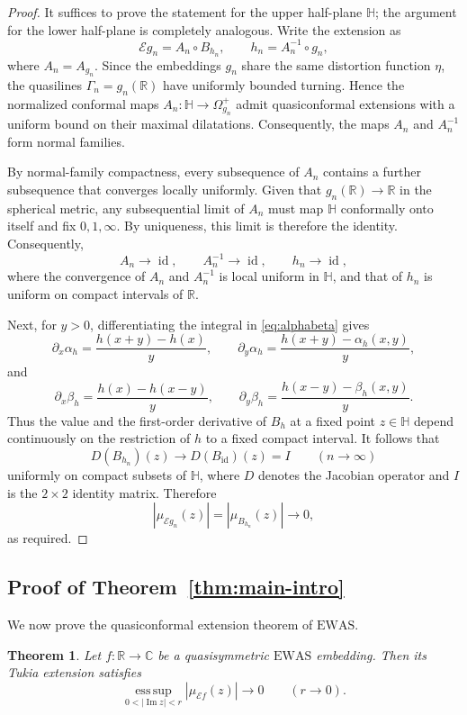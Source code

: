 \documentclass[10pt,a4paper]{amsart}
\numberwithin{equation}{section}
\newtheorem{theorem}{Theorem}[section]
\newcommand{\R}{\mathbb{R}}
\newcommand{\C}{\mathbb{C}}
\newcommand{\Hh}{\mathbb{H}}
\newcommand{\id}{\operatorname{id}}
\newcommand{\esssup}{\operatorname*{ess\,sup}}
\begin{document}
\begin{proof}
It suffices to prove the statement for the upper half-plane $\mathbb{H}$; the argument for the lower half-plane is completely analogous.
Write the extension as
\[
 \mathcal Eg_n=A_n\circ B_{h_n},
 \qquad h_n=A_n^{-1}\circ g_n,
\]
where $A_n=A_{g_n}$. 
Since the embeddings $g_n$ share the same distortion function $\eta$, the quasilines $\Gamma_n = g_n(\mathbb{R})$ have uniformly bounded turning.
Hence the normalized conformal maps $A_n\colon\mathbb H\to\Omega_{g_n}^+$ admit quasiconformal extensions with a uniform bound on their maximal dilatations. 
Consequently, the maps $A_n$ and $A_n^{-1}$ form normal families.

By normal-family compactness, every subsequence of $A_n$ contains a further subsequence that converges locally uniformly. 
Given that $g_n(\mathbb{R}) \to \mathbb{R}$ in the spherical metric, any subsequential limit of $A_n$ must map $\mathbb{H}$ conformally onto itself and fix $0, 1, \infty$. 
By uniqueness, this limit is therefore the identity. 
Consequently, 
\[
 A_n\to\id,
 \qquad A_n^{-1}\to\id,
 \qquad h_n\to\id,
\]
where the convergence of $A_n$ and $A_n^{-1}$ is local uniform in $\mathbb{H}$, and that of $h_n$ is uniform on compact intervals of $\mathbb{R}$.

Next, for $y>0$, differentiating the integral in \eqref{eq:alphabeta} gives
\[
 \partial_x\alpha_h=\frac{h(x+y)-h(x)}{y},\qquad\partial_y\alpha_h=\frac{h(x+y)-\alpha_h(x,y)}{y},
\]
and
\[
 \partial_x\beta_h=\frac{h(x)-h(x-y)}{y},\qquad\partial_y\beta_h=\frac{h(x-y)-\beta_h(x,y)}{y}.
\]
Thus the value and the first-order derivative of $B_h$ at a fixed point $z \in \mathbb H$
depend continuously on the restriction of $h$ to a fixed compact interval.  
It follows that
\[
 D(B_{h_n})(z)\to
 D(B_{\id})(z)=I \qquad (n\to\infty)
\]
uniformly on compact subsets of $\Hh$, where $D$ denotes the Jacobian operator and $I$ is the $2\times2$ identity matrix.  
Therefore
\[
 |\mu_{\mathcal Eg_n}(z)|
 =|\mu_{B_{h_n}}(z)|\to 0,
\]
as required.
\end{proof}

\subsection{Proof of Theorem~\ref{thm:main-intro}}

We now prove the quasiconformal extension theorem of $\mathrm{EWAS}$.

\begin{theorem}\label{thm:Esharp-AC}
Let $f\colon\R\to\C$ be a quasisymmetric $\mathrm{EWAS}$ embedding. 
Then its Tukia extension satisfies
\[
\esssup_{0<|\operatorname{Im}z|<r}
|\mu_{\mathcal Ef}(z)| \to 0 \qquad (r \to 0).
\]
\end{theorem}
\end{document}
